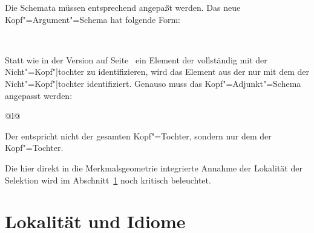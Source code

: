 \noindent
Die Schemata müssen entsprechend angepaßt werden. Das neue Kopf"=Argument"=Schema
hat folgende Form:
\begin{schema}
\label{schema-head-arg}
 \impl\\
\end{schema}
Statt wie in der Version auf Seite~\pageref{schema-bin-prel2} ein Element
der \compsl vollständig mit der Nicht"=Kopf"|tochter zu identifizieren, wird
das Element aus der \compsl nur mit dem \synsemw der Nicht"=Kopf"|tochter identifiziert.
Genauso muss das Kopf"=Adjunkt"=Schema angepasst werden:
\begin{schema}
\label{ha-schema-final}
\begin{tabular}[t]{@{}l@{}}
 \impl\\
\end{tabular}
\end{schema}
Der \modw entspricht nicht der gesamten Kopf"=Tochter, sondern nur dem \synsemw der Kopf"=Tochter.

Die hier direkt in die Merkmalsgeometrie integrierte Annahme der Lokalität der Selektion
wird im Abschnitt~\ref{disc-lokalitaet} noch kritisch beleuchtet.


\section{Lokalität und Idiome}
\label{disc-lokalitaet}

